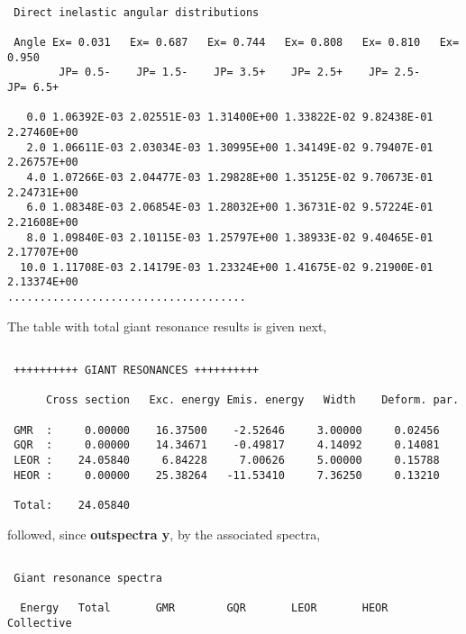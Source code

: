 \begin{samplecase}
{\small \begin{verbatim}

 Direct inelastic angular distributions
  
 Angle Ex= 0.031   Ex= 0.687   Ex= 0.744   Ex= 0.808   Ex= 0.810   Ex= 0.950   
        JP= 0.5-    JP= 1.5-    JP= 3.5+    JP= 2.5+    JP= 2.5-    JP= 6.5+    
  
   0.0 1.06392E-03 2.02551E-03 1.31400E+00 1.33822E-02 9.82438E-01 2.27460E+00
   2.0 1.06611E-03 2.03034E-03 1.30995E+00 1.34149E-02 9.79407E-01 2.26757E+00
   4.0 1.07266E-03 2.04477E-03 1.29828E+00 1.35125E-02 9.70673E-01 2.24731E+00
   6.0 1.08348E-03 2.06854E-03 1.28032E+00 1.36731E-02 9.57224E-01 2.21608E+00 
   8.0 1.09840E-03 2.10115E-03 1.25797E+00 1.38933E-02 9.40465E-01 2.17707E+00 
  10.0 1.11708E-03 2.14179E-03 1.23324E+00 1.41675E-02 9.21900E-01 2.13374E+00 
.....................................
\end{verbatim} } \renewcommand{\baselinestretch}{1.07}\small\normalsize
\noindent
The table with total giant resonance results is given next,

{\small \begin{verbatim}

 ++++++++++ GIANT RESONANCES ++++++++++
   
      Cross section   Exc. energy Emis. energy   Width    Deform. par.
   
 GMR  :     0.00000    16.37500    -2.52646     3.00000     0.02456
 GQR  :     0.00000    14.34671    -0.49817     4.14092     0.14081
 LEOR :    24.05840     6.84228     7.00626     5.00000     0.15788
 HEOR :     0.00000    25.38264   -11.53410     7.36250     0.13210

 Total:    24.05840
\end{verbatim} } \renewcommand{\baselinestretch}{1.07}\small\normalsize
\noindent
followed, since {\bf outspectra y}, by the associated spectra,

{\small \begin{verbatim}

 Giant resonance spectra

  Energy   Total       GMR        GQR       LEOR       HEOR     Collective


\end{verbatim}}
\end{samplecase}
